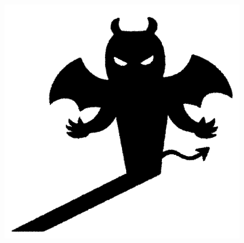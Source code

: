 \begin{frame}
  \pause
  \begin{columns}
    \begin{column}{0.2\textwidth}
      \begin{center}
        \includegraphics[width=0.95\textwidth]{img/akuma_shadow.png}
      \end{center}
    \end{column}
    \begin{column}{0.6\textwidth}
      \begin{center}
      \end{center}
    \end{column}
    \begin{column}{0.2\textwidth}
      \begin{center}

\end{center}
\end{column}
\end{columns}
\end{frame}

